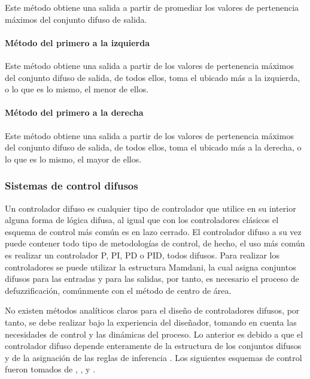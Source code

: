                 Este método obtiene una salida a partir de promediar los valores de pertenencia máximos del conjunto difuso de salida.

            \paragraph{Método del primero a la izquierda}
                
                Este método obtiene una salida a partir de los valores de pertenencia máximos del conjunto difuso de salida, de todos ellos, toma el ubicado más a la izquierda, o lo que es lo mismo, el menor de ellos.
            
            \paragraph{Método del primero a la derecha}
                
                Este método obtiene una salida a partir de los valores de pertenencia máximos del conjunto difuso de salida, de todos ellos, toma el ubicado más a la derecha, o lo que es lo mismo, el mayor de ellos.

        \subsubsection{Sistemas de control difusos}\label{sec:esquemasFuzzy}
            
            Un controlador difuso es cualquier tipo de controlador que utilice en su interior alguna forma de lógica difusa, al igual que con los controladores clásicos el esquema de control más común es en lazo cerrado. El controlador difuso a su vez puede contener todo tipo de metodologías de control, de hecho, el uso más común es realizar un controlador P, PI, PD o PID, todos difusos. Para realizar los controladores se puede utilizar la estructura Mamdani, la cual asigna conjuntos difusos para las entradas y para las salidas, por tanto, es necesario el proceso de defuzzificación, comúnmente con el método de centro de área.
            
            No existen métodos analíticos claros para el diseño de controladores difusos, por tanto, se debe realizar bajo la experiencia del diseñador, tomando en cuenta las necesidades de control y las dinámicas del proceso. Lo anterior es debido a que el controlador difuso depende enteramente de la estructura de los conjuntos difusos y de la asignación de las reglas de inferencia \Parencite{cruz2010inteligencia}. Los siguientes esquemas de control fueron tomados de \textcite{cruz2010inteligencia}, \textcite{riid2003transparent}, y \textcite{clavier2017tecnicas}.

